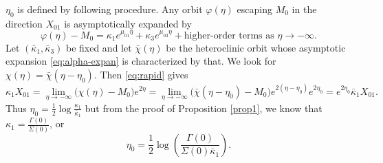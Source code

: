 \documentclass[a4paper,11pt]{article}
\theoremstyle{remark}
\begin{document}
$\eta_0$ is defined by following procedure. Any orbit $\varphi(\eta)$ escaping $M_0$ in the direction $X_{01}$ is asymptotically expanded by %
 \begin{equation}\label{eq:alpha-expan}
  \varphi(\eta) - M_0 = \kappa_1 e^{\mu_{01}\eta} + \kappa_3 e^{\mu_{03}\eta} + \text{higher-order terms as $\eta \rightarrow -\infty$}.
 \end{equation}
Let $(\bar\kappa_1,\bar\kappa_3)$ be fixed and let $\bar\chi(\eta)$ be the heteroclinic orbit whose asymptotic expansion \eqref{eq:alpha-expan} is characterized by that. We look for $\chi(\eta) = \bar\chi(\eta-\eta_0)$. Then \eqref{eq:rapid} gives
$$\kappa_1 X_{01}=\lim_{\eta \rightarrow -\infty}\big(\chi(\eta) - M_0\big)e^{2\eta} = \lim_{\eta \rightarrow -\infty} \big(\bar\chi(\eta-\eta_0) - M_0\big)e^{2(\eta-\eta_0)}e^{2\eta_0} = e^{2\eta_0}\bar\kappa_1 X_{01}.$$
Thus $\eta_0 = \frac{1}{2}\log {\frac{\kappa_1}{\bar\kappa_1}}$ but from the proof of Proposition \ref{prop1}, we know that
$\kappa_1 = \frac{\Gamma(0)}{\Sigma(0)}$, or
\begin{equation}
 \eta_0 = \frac{1}{2}\log \left(\frac{\Gamma(0)}{\Sigma(0)\bar\kappa_1}\right).%
\end{equation}
\end{document}
